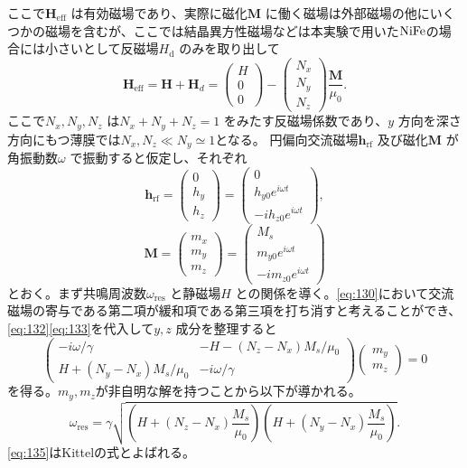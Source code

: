 \documentclass[dvipdfmx,11pt]{jsreport}
\numberwithin{equation}{chapter}
\numberwithin{table}{chapter}
\begin{document}
ここで$\bm{H}_\text{eff} $ は有効磁場であり、実際に磁化$\bm{M}$ に働く磁場は外部磁場の他にいくつかの磁場を含むが、ここでは結晶異方性磁場などは本実験で用いた$\ce{NiFe}$の場合には小さいとして反磁場$H_\text{d} $ のみを取り出して
\begin{equation}
\label{eq:131}
	\bm{H}_\text{eff} =\bm{H}+\bm{H}_d=\begin{pmatrix} H\\0\\0 \end{pmatrix} -\begin{pmatrix} N_x\\N_y\\N_z \end{pmatrix} \frac{\bm{M}}{\mu_0}
.\end{equation}
ここで$N_x,N_y,N_z$ は$N_x+N_y+N_z=1$ をみたす反磁場係数であり、$y$ 方向を深さ方向にもつ薄膜では$N_x,N_z\ll N_y\simeq 1$となる。
円偏向交流磁場$\bm{h}_\text{rf} $ 及び磁化$\bm{M}$ が角振動数$\omega$ で振動すると仮定し、それぞれ
\begin{equation}
\label{eq:132}
	\bm{h}_\text{rf} =\begin{pmatrix} 0\\h_y\\h_z \end{pmatrix} = \begin{pmatrix} 0\\h_{y0}e^{i\omega t}\\-ih_{z 0}e^{i\omega t} \end{pmatrix} 
,\end{equation}
\begin{equation}
\label{eq:133}
	\bm{M} =\begin{pmatrix} m_x\\m_y\\m_z \end{pmatrix} = \begin{pmatrix} M_s\\m_{y0}e^{i\omega t}\\-im_{z 0}e^{i\omega t} \end{pmatrix} 
\end{equation}
とおく。まず共鳴周波数$\omega_\text{res} $ と静磁場$H$ との関係を導く。\eqref{eq:130}において交流磁場の寄与である第二項が緩和項である第三項を打ち消すと考えることができ、\eqref{eq:132}\eqref{eq:133}を代入して$y,z$ 成分を整理すると
\begin{equation}
\label{eq:134}
\begin{pmatrix}  -i \omega  /\gamma&-H-(N_z-N_x) M_s /\mu_0 \\ H+(N_y-N_x) M_s /\mu_0 & -i \omega /\gamma\end{pmatrix} \begin{pmatrix} m_y \\ m_z \end{pmatrix} =0
\end{equation}
を得る。$m_y,m_z$が非自明な解を持つことから以下が導かれる。
\begin{equation}
\label{eq:135}
	\omega_\text{res} =\gamma \sqrt{\left( H+(N_z-N_x) \frac{M_s}{\mu_0} \right)\left( H+(N_y-N_x) \frac{M_s}{\mu_0} \right)  } 
.\end{equation}
\eqref{eq:135}はKittelの式とよばれる。
\end{document}
